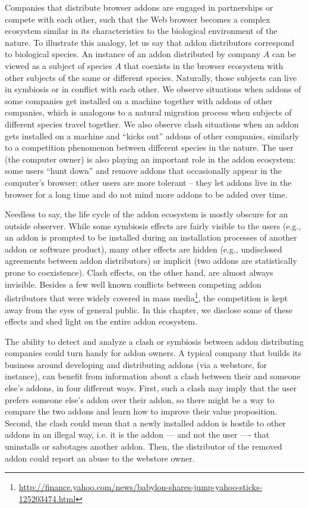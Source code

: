 \documentclass[11pt,oneside]{book}
\begin{document}
Companies that distribute browser addons are engaged in partnerships or compete with each other, such that the Web browser becomes a complex ecosystem similar in its characteristics to the biological environment of the nature. To illustrate this analogy, let us say that addon distributors correspond to biological species. An instance of an addon distributed by company $A$ can be viewed as a subject of species $A$ that coexists in the browser ecosystem with other subjects of the same or different species. Naturally, those subjects can live in symbiosis or in conflict with each other. We observe situations when addons of some companies get installed on a machine together with addons of other companies, which is analogous to a natural migration process when subjects of different species travel together. We also observe clash situations when an addon gets installed on a machine and ``kicks out'' addons of other companies, similarly to a competition phenomenon between different species in the nature. The user (the computer owner) is also playing an important role in the addon ecosystem: some users ``hunt down'' and remove addons that occasionally appear in the computer's browser; other users are more tolerant -- they let addons live in the browser for a long time and do not mind more addons to be added over time.

Needless to say, the life cycle of the addon ecosystem is mostly obscure for an outside observer. While some symbiosis effects are fairly visible to the users (e.g., an addon is prompted to be installed during an installation processes of another addon or software product), many other effects are hidden (e.g., undisclosed agreements between addon distributors) or implicit (two addons are statistically prone to coexistence). Clash effects, on the other hand, are almost always invisible. Besides a few well known conflicts between competing addon distributors that were widely covered in mass media\footnote{\url{http://finance.yahoo.com/news/babylon-shares-jump-yahoo-sticks-125203474.html}}, the competition is kept away from the eyes of general public. In this chapter, we disclose some of these effects and shed light on the entire addon ecosystem. 

The ability to detect and analyze a clash or symbiosis between addon distributing companies could turn handy for addon owners. 
A typical company that builds its business around developing and distributing addons (via a webstore, for instance), can benefit from information about a clash between their and someone else's addons, in four different ways.
First, such a clash may imply that the user prefers someone else's addon over their addon, so there might be a way to compare the two addons and  learn how to improve their value proposition. 
Second, the clash could mean that a newly installed addon is hostile to other addons in an illegal way, i.e. it is the addon --- and not the user ---- that uninstalls or sabotages another addon. Then, the distributor of the removed addon could report an abuse to the webstore owner.
\end{document}
